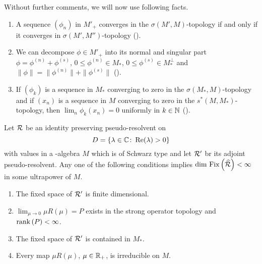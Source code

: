 Without further comments, we will now use following facts.
\begin{enumerate}[(1)]
\item
A sequence $ (\phi_{n}) $  in $ M'_{+} $  converges in the $ \sigma(M',M) $-topology if and only if it converges in $ \sigma(M',M'') $-topology (\citet{akemann:1972}).

\item
We can decompose $ \phi \in M'_{+} $  into its normal and singular part $ \phi = \phi^{(n)} + \phi^{(s)} $, $ 0 \leq \phi^{(n)} \in M_{*} $, $ 0 \leq \phi^{(s)} \in M_*^{\perp} $  and $ \|\phi\| = \|\phi^{(n)}\| + \|\phi^{(s)}\| $  (\citet[Theorem III.2.14]{takesaki:1979}).

\item
If $ (\phi_{k}) $  is a sequence in $ M_{*} $  converging to zero in the $ \sigma(M_{*},M) $-topology and if $ (x_{n}) $  is a sequence in $ M $  converging to zero in the $ s^{*}(M,M_{*}) $-topology, then $ \lim_{n} \phi_{k}(x_{n}) = 0 $  uniformly in $ k \in \mathbb{N} $  (\citet[Lemma III.5.5]{takesaki:1979}).
\end{enumerate}
\begin{theorem}\label{thm:d4-4.4}
Let $ \mathcal{R} $  be an identity preserving pseudo-resolvent on 
%
\[
	D = \{\lambda \in \mathbb{C} \colon  \mathop{}\!\mathrm{Re}(\lambda) > 0\} 
\]
%
with values in a \WA-algebra $ M $  which is of Schwarz type and let $ \mathcal{R}' $  br its adjoint pseudo-resolvent.
Any one of the following conditions implies $ \dim \mathop{}\mathrm{Fix}\left(\widehat{\mathcal{R}}\right) < \infty $  in some ultrapower of $ M $.
\begin{enumerate}[\upshape (i)]
\item
The fixed space of $ \mathcal{R}' $  is finite dimensional.

\item
$ \lim_{\mu \to 0} \mu R(\mu) = P $  exists in the strong operator topology and $ \mathop{}\!\mathrm{rank}\, (P) < \infty $.

\item
The fixed space of\/ $ \mathcal{R}' $  is contained in $ M_{*} $.

\item
Every map $ \mu R(\mu) $, $ \mu \in \mathbb{R}_{+} $, is irreducible on $ M $.
\end{enumerate}
\end{theorem}
